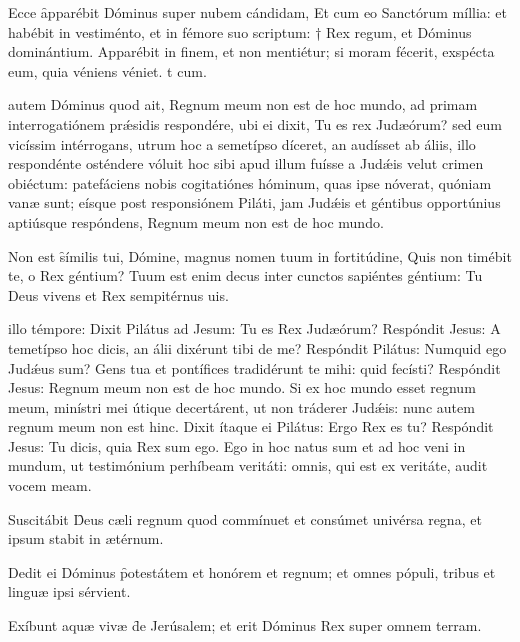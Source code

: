 \documentclass[fontsize=8pt,paper=A6,twoside,BCOR=1mm,DIV=22,headinclude]{scrarticle}
\begin{document}
\begin{multicols}{2}
{\R Ecce \f apparébit Dóminus super nubem cándidam,
\red{*} Et cum eo Sanctórum míllia: et habébit in vestiménto, et in fémore suo scriptum: † Rex regum, et Dóminus dominántium.
\V Apparébit in finem, et non mentiétur; si moram fécerit, exspécta eum, quia véniens véniet.
t cum.

 autem Dóminus quod ait, Regnum meum non est de hoc mundo, ad primam interrogatiónem prǽsidis respondére, ubi ei dixit, Tu es rex Judæórum? sed eum vicíssim intérrogans, utrum hoc a semetípso díceret, an audísset ab áliis, illo respondénte osténdere vóluit hoc sibi apud illum fuísse a Judǽis velut crimen obiéctum: patefáciens nobis cogitatiónes hóminum, quas ipse nóverat, quóniam vanæ sunt; eísque post responsiónem Piláti, jam Judǽis et géntibus opportúnius aptiúsque respóndens, Regnum meum non est de hoc mundo.

\R Non est \f símilis tui, Dómine, magnus nomen tuum in fortitúdine,
\red{*} Quis non timébit te, o Rex géntium?
\V Tuum est enim decus inter cunctos sapiéntes géntium: Tu Deus vivens et Rex sempitérnus
uis.

}

{


 illo témpore: Dixit Pilátus ad Jesum: Tu es Rex Judæórum? Respóndit Jesus: A temetípso hoc dicis, an álii dixérunt tibi de me? Respóndit Pilátus: Numquid ego Judǽus sum? Gens tua et pontífices tradidérunt te mihi: quid fecísti? Respóndit Jesus: Regnum meum non est de hoc mundo. Si ex hoc mundo esset regnum meum, minístri mei útique decertárent, ut non tráderer Judǽis: nunc autem regnum meum non est hinc. Dixit ítaque ei Pilátus: Ergo Rex es tu? Respóndit Jesus: Tu dicis, quia Rex sum ego. Ego in hoc natus sum et ad hoc veni in mundum, ut testimónium perhíbeam veritáti: omnis, qui est ex veritáte, audit vocem meam.


\etper

 Suscitábit \f Deus cæli regnum quod commínuet et consúmet univérsa regna, et ipsum stabit in ætérnum. \Dominusregnavit

 Dedit ei Dóminus \f potestátem et honórem et regnum; et omnes pópuli, tribus et linguæ ipsi sérvient.

 Exíbunt aquæ vivæ \f de Jerúsalem; et erit Dóminus Rex super omnem terram.

}
\end{multicols}
\end{document}
